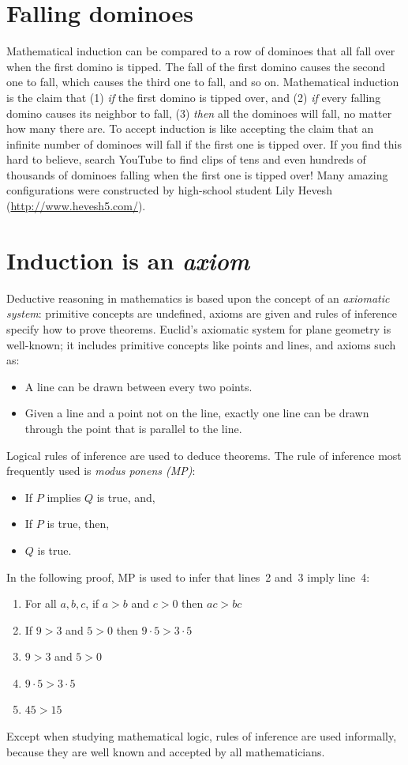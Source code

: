 \documentclass[11pt,a4paper]{report}
\begin{document}
\section{Falling dominoes}

Mathematical induction can be compared to a row of dominoes that all fall over when the first domino is tipped. The fall of the first domino causes the second one to fall, which causes the third one to fall, and so on. Mathematical induction is the claim that (1) \emph{if} the first domino is tipped over, and (2) \emph{if} every falling domino causes its neighbor to fall, (3) \emph{then} all the dominoes will fall, no matter how many there are. To accept induction is like accepting the claim that an infinite number of dominoes will fall if the first one is tipped over. If you find this hard to believe, search YouTube to find clips of tens and even hundreds of thousands of dominoes falling when the first one is tipped over! Many amazing configurations were constructed by high-school student Lily Hevesh (\url{http://www.hevesh5.com/}).

\section{Induction is an \emph{axiom}}

Deductive reasoning in mathematics is based upon the concept of an \emph{axiomatic system}: primitive concepts are undefined, axioms are given and rules of inference specify how to prove theorems. Euclid's axiomatic system for plane geometry is well-known; it includes primitive concepts like points and lines, and axioms such as:
\begin{itemize}
\item A line can be drawn between every two points.
\item Given a line and a point not on the line, exactly one line can be drawn through the point that is parallel to the line.
\end{itemize}
Logical rules of inference are used to deduce theorems. The rule of inference most frequently used is \emph{modus ponens (MP)}:
\pagebreak[3]
\begin{itemize}
\item If $P$ implies $Q$ is true, and,
\item If $P$ is true, then,
\item $Q$ is true.
\end{itemize}
In the following proof, MP is used to infer that lines~2 and~3 imply line~4:
\begin{enumerate}
\item For all $a,b,c$, if $a>b$ and $c>0$ then $ac>bc$
\item If $9>3$ and $5>0$ then $9\cdot 5> 3\cdot 5$
\item $9>3$ and $5>0$
\item $9\cdot 5> 3\cdot 5$
\item $45>15$
\end{enumerate}
Except when studying mathematical logic, rules of inference are used informally, because they are well known and accepted by all mathematicians.
\end{document}
